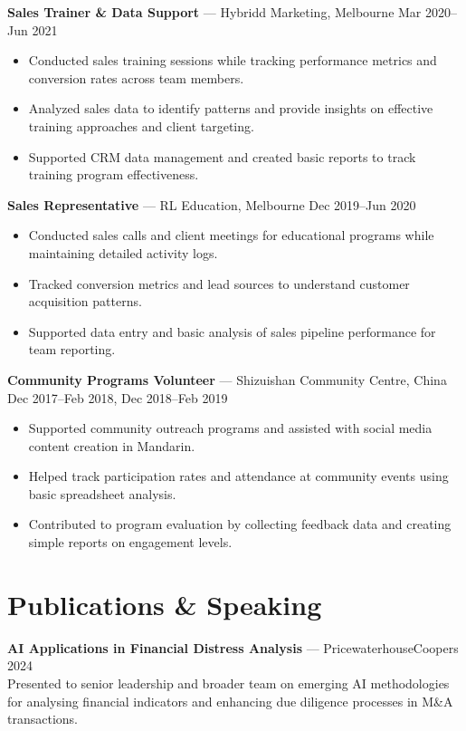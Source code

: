 \documentclass[10pt,letterpaper]{article}
\begin{document}
\textbf{Sales Trainer \& Data Support} — Hybridd Marketing, Melbourne \hfill Mar 2020--Jun 2021\\[-1.5em]
\begin{itemize}
  \item Conducted sales training sessions while tracking performance metrics and conversion rates across team members.
  \item Analyzed sales data to identify patterns and provide insights on effective training approaches and client targeting.
  \item Supported CRM data management and created basic reports to track training program effectiveness.
\end{itemize}

\textbf{Sales Representative} — RL Education, Melbourne \hfill Dec 2019--Jun 2020\\[-1.5em]
\begin{itemize}
  \item Conducted sales calls and client meetings for educational programs while maintaining detailed activity logs.
  \item Tracked conversion metrics and lead sources to understand customer acquisition patterns.
  \item Supported data entry and basic analysis of sales pipeline performance for team reporting.
\end{itemize}

\textbf{Community Programs Volunteer} — Shizuishan Community Centre, China \hfill Dec 2017--Feb 2018, Dec 2018--Feb 2019\\[-1.5em]
\begin{itemize}
  \item Supported community outreach programs and assisted with social media content creation in Mandarin.
  \item Helped track participation rates and attendance at community events using basic spreadsheet analysis.
  \item Contributed to program evaluation by collecting feedback data and creating simple reports on engagement levels.
\end{itemize}

\section*{Publications \& Speaking}

\textbf{AI Applications in Financial Distress Analysis} — PricewaterhouseCoopers \hfill 2024\\
Presented to senior leadership and broader team on emerging AI methodologies for analysing financial indicators and enhancing due diligence processes in M\&A transactions.
\end{document}
